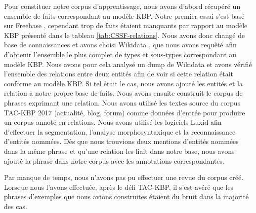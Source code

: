 \documentclass[PhD-Yoann-Dupont.tex]{subfiles}
\begin{document}
Pour constituer notre corpus d'apprentissage, nous avons d'abord récupéré un ensemble de faits correspondant au modèle KBP. Notre premier essai s'est basé sur Freebase \citep{bollacker2008freebase}, cependant trop de faits étaient manquants par rapport au modèle KBP présenté dans le tableau \ref{tab:CSSF-relations}. Nous avons donc changé de base de connaissances et avons choisi Wikidata \citep{vrandevcic2014wikidata}, que nous avons requêté afin d'obtenir l'ensemble le plus complet de types et sous-types correspondant au modèle KBP. Nous avons pour cela analysé un dump de Wikidata et avons vérifié l'ensemble des relations entre deux entités afin de voir si cette relation était conforme au modèle KBP. Si tel était le cas, nous avons ajouté les entités et la relation à notre propre base de faits. Nous avons ensuite construit le corpus de phrases exprimant une relation. Nous avons utilisé les textes source du corpus TAC-KBP 2017 (actualité, blog, forum) \citep{surdeanu2014overview} comme données d'entrée pour produire un corpus annoté en relations. Nous avons utilisé les logiciels Luxid afin d'effectuer la segmentation, l'analyse morphosyntaxique et la reconnaissance d'entités nommées. Dès que nous trouvions deux mentions d'entités nommées dans la même phrase et qu'une relation les liait dans notre base, nous avons ajouté la phrase dans notre corpus avec les annotations correspondantes.

Par manque de temps, nous n'avons pas pu effectuer une revue du corpus créé. Lorsque nous l'avons effectuée, après le défi TAC-KBP, il s'est avéré que les phrases d'exemples que nous avions construites étaient du bruit dans la majorité des cas.

\end{document}
